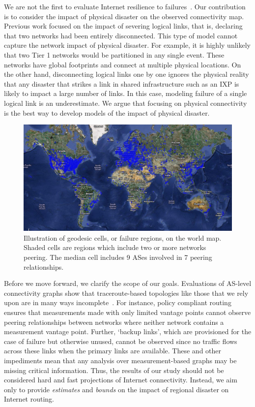 We are not the first to evaluate Internet resilience to
failures~\cite{michigan, measuringresilience, resilience-under-BGP,
resilience-complex-networks}.  Our contribution is to consider the impact of
physical disaster on the observed connectivity map.  Previous work focused on
the impact of severing logical links, that is, declaring that two networks had
been entirely disconnected.  This type of model cannot capture the network
impact of physical disaster.  For example, it is highly unlikely that two Tier
1 networks would be partitioned in any single event.  These networks have
global footprints and connect at multiple physical locations.
  On the other hand, disconnecting logical links
one by one ignores the physical reality that any disaster that strikes a link
in shared infrastructure such as an IXP is likely to impact a large number of
links.  In this case, modeling failure of a single logical link is an
underestimate.  We argue that focusing on physical connectivity is the best way to
develop models of the impact of physical disaster. 
 
\begin{figure}[htb]
\centering
\includegraphics[width=6in]{world_map.jpg}
\caption[]{\label{fig:worldmap}  Illustration of geodesic cells, or failure regions, on the world map. Shaded cells are regions which include two or more networks peering. The median cell includes 9 ASes involved in 7 peering relationships.} 
\end{figure}

Before we move forward, we clarify the scope of our goals.  Evaluations of
AS-level connectivity graphs show that traceroute-based topologies like those
that we rely upon are in many ways incomplete~\cite{walter}.  For instance,
policy compliant routing ensures that measurements made with only limited
vantage points cannot observe peering relationships between networks where
neither network contains a measurement vantage point.  Further, `backup links',
which are provisioned for the case of failure but otherwise unused, cannot be
observed since no traffic flows across these links when the primary links are
available.  These and other impediments mean that any analysis over
measurement-based graphs may be missing critical information.  Thus, the
results of our study should not be considered hard and fast projections of
Internet connectivity.  Instead, we aim only to provide {\it estimates} and
{\it bounds} on the impact of regional disaster on Internet routing.

